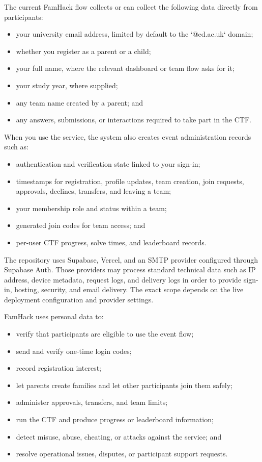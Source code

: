 \documentclass[11pt]{article}
\begin{document}
The current FamHack flow collects or can collect the following data directly from participants:
\begin{itemize}
  \item your university email address, limited by default to the `@ed.ac.uk` domain;
  \item whether you register as a parent or a child;
  \item your full name, where the relevant dashboard or team flow asks for it;
  \item your study year, where supplied;
  \item any team name created by a parent; and
  \item any answers, submissions, or interactions required to take part in the CTF.
\end{itemize}

When you use the service, the system also creates event administration records such as:
\begin{itemize}
  \item authentication and verification state linked to your sign-in;
  \item timestamps for registration, profile updates, team creation, join requests, approvals, declines, transfers, and leaving a team;
  \item your membership role and status within a team;
  \item generated join codes for team access; and
  \item per-user CTF progress, solve times, and leaderboard records.
\end{itemize}

The repository uses Supabase, Vercel, and an SMTP provider configured through Supabase Auth. Those providers may process standard technical data such as IP address, device metadata, request logs, and delivery logs in order to provide sign-in, hosting, security, and email delivery. The exact scope depends on the live deployment configuration and provider settings.

FamHack uses personal data to:
\begin{itemize}
  \item verify that participants are eligible to use the event flow;
  \item send and verify one-time login codes;
  \item record registration interest;
  \item let parents create families and let other participants join them safely;
  \item administer approvals, transfers, and team limits;
  \item run the CTF and produce progress or leaderboard information;
  \item detect misuse, abuse, cheating, or attacks against the service; and
  \item resolve operational issues, disputes, or participant support requests.
\end{itemize}
\end{document}
